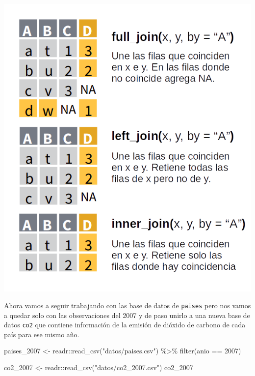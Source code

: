 \documentclass[
  openany]{book}
\newenvironment{Shaded}{\begin{snugshade}}{\end{snugshade}}
\newcommand{\DecValTok}[1]{\textcolor[rgb]{0.00,0.00,0.81}{#1}}
\newcommand{\FunctionTok}[1]{\textcolor[rgb]{0.00,0.00,0.00}{#1}}
\newcommand{\NormalTok}[1]{#1}
\newcommand{\OtherTok}[1]{\textcolor[rgb]{0.56,0.35,0.01}{#1}}
\newcommand{\SpecialCharTok}[1]{\textcolor[rgb]{0.00,0.00,0.00}{#1}}
\newcommand{\StringTok}[1]{\textcolor[rgb]{0.31,0.60,0.02}{#1}}
\begin{document}
\includegraphics{img/join_family.png}

Ahora vamos a seguir trabajando con las base de datos de \texttt{paises} pero nos vamos a quedar solo con las observaciones del 2007 y de paso unirlo a una nueva base de datos \texttt{co2} que contiene información de la emisión de dióxido de carbono de cada país para ese mismo año.

\begin{Shaded}
\begin{Highlighting}[]
\NormalTok{paises\_2007 }\OtherTok{\textless{}{-}}\NormalTok{ readr}\SpecialCharTok{::}\FunctionTok{read\_csv}\NormalTok{(}\StringTok{"datos/paises.csv"}\NormalTok{) }\SpecialCharTok{\%\textgreater{}\%} 
  \FunctionTok{filter}\NormalTok{(anio }\SpecialCharTok{==} \DecValTok{2007}\NormalTok{) }

\NormalTok{co2\_2007 }\OtherTok{\textless{}{-}}\NormalTok{ readr}\SpecialCharTok{::}\FunctionTok{read\_csv}\NormalTok{(}\StringTok{"datos/co2\_2007.csv"}\NormalTok{)}
\NormalTok{co2\_2007}
\end{Highlighting}
\end{Shaded}
\end{document}
